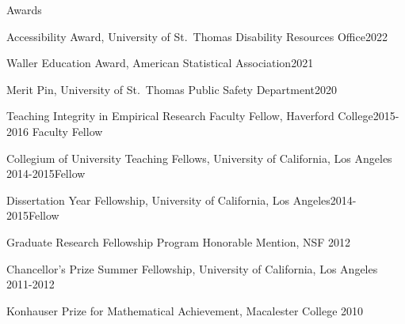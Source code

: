 \documentclass{resume} %
\begin{document}
\begin{rSection}{Awards}
\begin{esSubsection}{Accessibility Award,}{ University of St.\ Thomas Disability Resources Office}{2022}
{}{}
\end{esSubsection}

\begin{esSubsection}{Waller Education Award,}{ American Statistical Association}{2021}
{}{}
\end{esSubsection}
\begin{esSubsection}{Merit Pin,}{ University of St.\ Thomas Public Safety Department}{2020}{}{}
\end{esSubsection}
\begin{esSubsection}{Teaching Integrity in Empirical Research Faculty Fellow,}{ Haverford College}{2015-2016}
{Faculty Fellow}{}
\end{esSubsection}
\begin{esSubsection}{Collegium of University Teaching Fellows,}{ University of California, Los Angeles }{2014-2015}{Fellow}{}
\end{esSubsection}
\begin{esSubsection}{Dissertation Year Fellowship,}{ University of California, Los Angeles}{2014-2015}{Fellow}{}
\end{esSubsection}
\begin{esSubsection}{Graduate Research Fellowship Program Honorable Mention,}{ NSF }{2012}{}{}
\end{esSubsection}
\begin{esSubsection}{Chancellor's Prize Summer Fellowship,}{ University of California, Los Angeles }{2011-2012}{}{}
\end{esSubsection}
\begin{esSubsection}{Konhauser Prize for Mathematical Achievement,}{ Macalester College}{ 2010}{}{}
\end{esSubsection}
\end{rSection}



\end{document}
